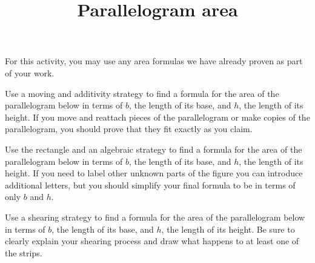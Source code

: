 \documentclass[nooutcomes,noauthor, handout]{ximera}
\title{Parallelogram area}
\begin{document}
\begin{abstract}
\end{abstract}

\maketitle

For this activity, you may use any area formulas we have already proven as part of your work.

\begin{problem}
Use a moving and additivity strategy to find a formula for the area of the parallelogram below in terms of $b$, the length of its base, and $h$, the length of its height. If you move and reattach pieces of the parallelogram or make copies of the parallelogram, you should prove that they fit exactly as you claim.

\begin{image}
\end{image}
\end{problem} \vfill

\begin{problem}
Use the rectangle and an algebraic strategy to find a formula for the area of the parallelogram below in terms of $b$, the length of its base, and $h$, the length of its height. If you need to label other unknown parts of the figure you can introduce additional letters, but you should simplify your final formula to be in terms of only $b$ and $h$.

\begin{image}
\end{image}
\end{problem} \vfill

\newpage
\begin{problem}
Use a shearing strategy to find a formula for the area of the parallelogram below in terms of $b$, the length of its base, and $h$, the length of its height. Be sure to clearly explain your shearing process and draw what happens to at least one of the strips.

\begin{image}
\end{image}
\end{problem}
\end{document}
